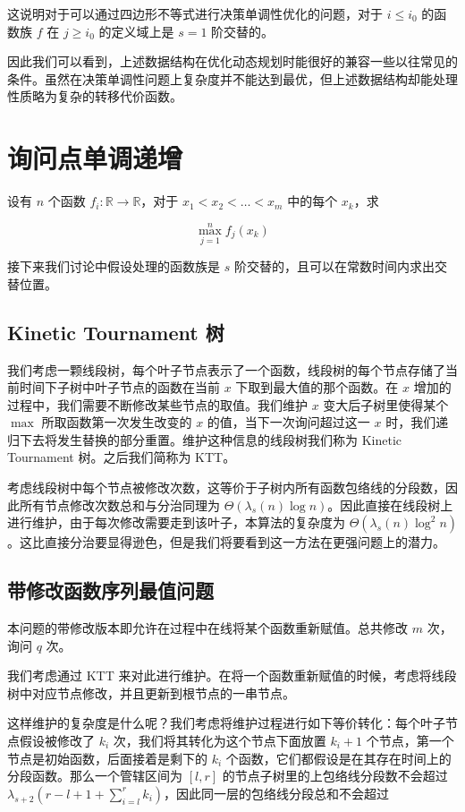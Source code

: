 \documentclass{noithesis}
\begin{document}
这说明对于可以通过四边形不等式进行决策单调性优化的问题，对于 $i\le i_0$ 的函数族 $f$ 在 $j \ge i_0$ 的定义域上是 $s=1$ 阶交替的。

因此我们可以看到，上述数据结构在优化动态规划时能很好的兼容一些以往常见的条件。虽然在决策单调性问题上复杂度并不能达到最优，但上述数据结构却能处理性质略为复杂的转移代价函数。

\section{询问点单调递增}

设有 $n$ 个函数 $f_i : \mathbb R \rightarrow \mathbb R$，对于 $x_1 < x_2 < \dots < x_m$ 中的每个 $x_k$，求

$$
\max_{j=1}^n f_j(x_k)
$$

接下来我们讨论中假设处理的函数族是 $s$ 阶交替的，且可以在常数时间内求出交替位置。

\subsection{Kinetic Tournament 树}

我们考虑一颗线段树，每个叶子节点表示了一个函数，线段树的每个节点存储了当前时间下子树中叶子节点的函数在当前 $x$ 下取到最大值的那个函数。在 $x$ 增加的过程中，我们需要不断修改某些节点的取值。我们维护 $x$ 变大后子树里使得某个 $\max$ 所取函数第一次发生改变的 $x$ 的值，当下一次询问超过这一 $x$ 时，我们递归下去将发生替换的部分重置。维护这种信息的线段树我们称为 Kinetic Tournament 树。之后我们简称为 KTT。

考虑线段树中每个节点被修改次数，这等价于子树内所有函数包络线的分段数，因此所有节点修改次数总和与分治同理为 $\Theta(\lambda_s(n)\log n)$。因此直接在线段树上进行维护，由于每次修改需要走到该叶子，本算法的复杂度为 $\Theta(\lambda_s(n)\log^2 n)$。这比直接分治要显得逊色，但是我们将要看到这一方法在更强问题上的潜力。

\subsection{带修改函数序列最值问题}

本问题的带修改版本即允许在过程中在线将某个函数重新赋值。总共修改 $m$ 次，询问 $q$ 次。

我们考虑通过 KTT 来对此进行维护。在将一个函数重新赋值的时候，考虑将线段树中对应节点修改，并且更新到根节点的一串节点。

这样维护的复杂度是什么呢？我们考虑将维护过程进行如下等价转化：每个叶子节点假设被修改了 $k_i$ 次，我们将其转化为这个节点下面放置 $k_i + 1$ 个节点，第一个节点是初始函数，后面接着是剩下的 $k_i$ 个函数，它们都假设是在其存在时间上的分段函数。那么一个管辖区间为 $[l, r]$ 的节点子树里的上包络线分段数不会超过 $\lambda_{s + 2}(r - l + 1 + \sum_{i=l}^r k_i)$，因此同一层的包络线分段总和不会超过
\end{document}
